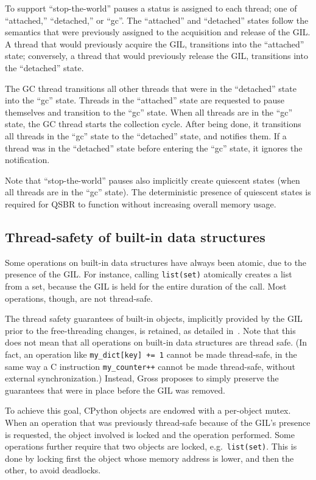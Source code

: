 To support ``stop-the-world'' pauses a status is assigned to each thread; one of ``attached,'' ``detached,'' or ``gc''.
The ``attached'' and ``detached'' states follow the semantics that were previously assigned to the acquisition and release of the GIL\@.
A thread that would previously acquire the GIL, transitions into the ``attached'' state; conversely, a thread that would previously release the GIL, transitions into the ``detached'' state.

The GC thread transitions all other threads that were in the ``detached'' state into the ``gc'' state.
Threads in the ``attached'' state are requested to pause themselves and transition to the ``gc'' state.
When all threads are in the ``gc'' state, the GC thread starts the collection cycle.
After being done, it transitions all threads in the ``gc'' state to the ``detached'' state, and notifies them.
If a thread was in the ``detached'' state before entering the ``gc'' state, it ignores the notification.

Note that ``stop-the-world'' pauses also implicitly create quiescent states (when all threads are in the ``gc'' state).
The deterministic presence of quiescent states is required for QSBR to function without increasing overall memory usage.


\subsection{Thread-safety of built-in data structures}\label{subsec:thread-safety-of-builtin-data-structures}

Some operations on built-in data structures have always been atomic, due to the presence of the GIL\@.
For instance, calling \texttt{{list(set)}} atomically creates a list from a set, because the GIL is held for the entire duration of the call.
Most operations, though, are not thread-safe.

The thread safety guarantees of built-in objects, implicitly provided by the GIL prior to the free-threading changes, is retained, as detailed in~\cite[\S Container Thread-Safety]{pep703}.
Note that this does not mean that all operations on built-in data structures are thread safe.
(In fact, an operation like \texttt{{my\_dict[key] += 1}} cannot be made thread-safe, in the same way a C instruction \texttt{{my\_counter++}} cannot be made thread-safe, without external synchronization.)
Instead, Gross proposes to simply preserve the guarantees that were in place before the GIL was removed.

To achieve this goal, CPython objects are endowed with a per-object mutex.
When an operation that was previously thread-safe because of the GIL's presence is requested, the object involved is locked and the operation performed.
Some operations further require that two objects are locked, e.g.\ \texttt{{list(set)}}.
This is done by locking first the object whose memory address is lower, and then the other, to avoid deadlocks.

